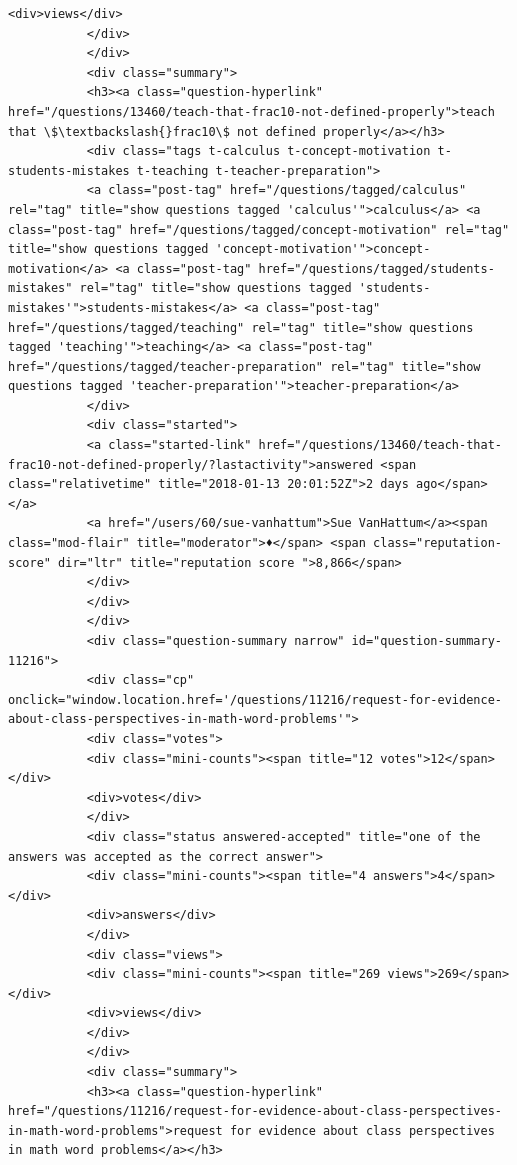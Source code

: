\documentclass[11pt]{article}
\begin{document}
\begin{Verbatim}[commandchars=\\\{\}]
           <div>views</div>
           </div>
           </div>
           <div class="summary">
           <h3><a class="question-hyperlink" href="/questions/13460/teach-that-frac10-not-defined-properly">teach that \$\textbackslash{}frac10\$ not defined properly</a></h3>
           <div class="tags t-calculus t-concept-motivation t-students-mistakes t-teaching t-teacher-preparation">
           <a class="post-tag" href="/questions/tagged/calculus" rel="tag" title="show questions tagged 'calculus'">calculus</a> <a class="post-tag" href="/questions/tagged/concept-motivation" rel="tag" title="show questions tagged 'concept-motivation'">concept-motivation</a> <a class="post-tag" href="/questions/tagged/students-mistakes" rel="tag" title="show questions tagged 'students-mistakes'">students-mistakes</a> <a class="post-tag" href="/questions/tagged/teaching" rel="tag" title="show questions tagged 'teaching'">teaching</a> <a class="post-tag" href="/questions/tagged/teacher-preparation" rel="tag" title="show questions tagged 'teacher-preparation'">teacher-preparation</a>
           </div>
           <div class="started">
           <a class="started-link" href="/questions/13460/teach-that-frac10-not-defined-properly/?lastactivity">answered <span class="relativetime" title="2018-01-13 20:01:52Z">2 days ago</span></a>
           <a href="/users/60/sue-vanhattum">Sue VanHattum</a><span class="mod-flair" title="moderator">♦</span> <span class="reputation-score" dir="ltr" title="reputation score ">8,866</span>
           </div>
           </div>
           </div>
           <div class="question-summary narrow" id="question-summary-11216">
           <div class="cp" onclick="window.location.href='/questions/11216/request-for-evidence-about-class-perspectives-in-math-word-problems'">
           <div class="votes">
           <div class="mini-counts"><span title="12 votes">12</span></div>
           <div>votes</div>
           </div>
           <div class="status answered-accepted" title="one of the answers was accepted as the correct answer">
           <div class="mini-counts"><span title="4 answers">4</span></div>
           <div>answers</div>
           </div>
           <div class="views">
           <div class="mini-counts"><span title="269 views">269</span></div>
           <div>views</div>
           </div>
           </div>
           <div class="summary">
           <h3><a class="question-hyperlink" href="/questions/11216/request-for-evidence-about-class-perspectives-in-math-word-problems">request for evidence about class perspectives in math word problems</a></h3>

\end{Verbatim}
\end{document}
